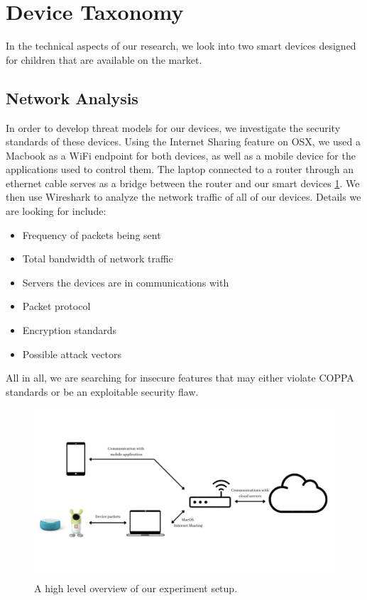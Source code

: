 \documentclass[12pt]{ucthesis}
\begin{document}
\section{Device Taxonomy}
In the technical aspects of our research, we look into two smart devices designed for children that are available on the market.

\subsection{Network Analysis}
In order to develop threat models for our devices, we investigate the security standards of these devices. Using the Internet Sharing feature on OSX, we used a Macbook as a WiFi endpoint for both devices, as well as a mobile device for the applications used to control them. The laptop connected to a router through an ethernet cable serves as a bridge between the router and our smart devices \ref{fig:experiment}. We then use Wireshark to analyze the network traffic of all of our devices. Details we are looking for include:

\begin{itemize}
    \item Frequency of packets being sent 
    \item Total bandwidth of network traffic 
    \item Servers the devices are in communications with 
    \item Packet protocol
    \item Encryption standards
    \item Possible attack vectors
\end{itemize}

All in all, we are searching for insecure features that may either violate COPPA standards or be an exploitable security flaw.

\begin{figure}
    \includegraphics[width=\textwidth]{experiment.jpg}
    \caption{A high level overview of our experiment setup.}
    \label{fig:experiment}
\end{figure}
\end{document}
